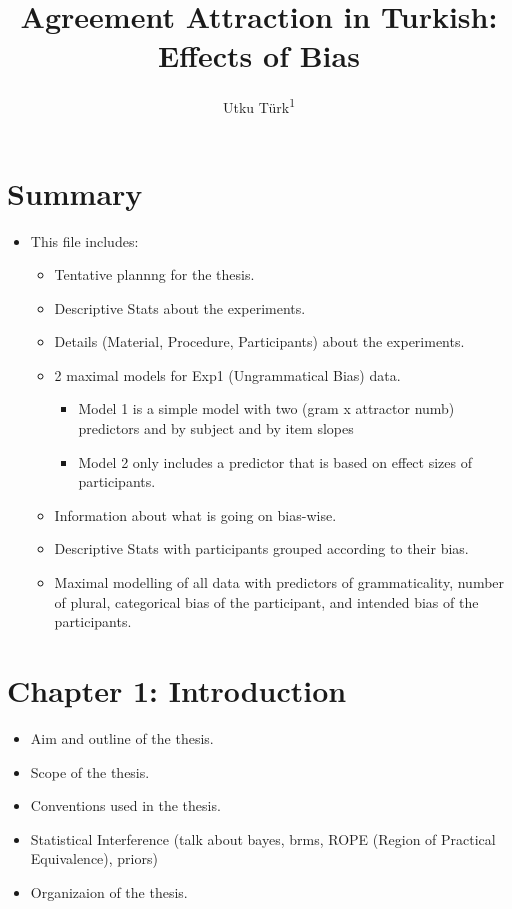 \documentclass[
  10pt,
  english,
  doc,floatsintext]{apa6}
\title{Agreement Attraction in Turkish: Effects of Bias}
\author{Utku Türk\textsuperscript{1}}
\date{}
\affiliation{\vspace{0.5cm}\textsuperscript{1} Boğaziçi University}
\providecommand{\tightlist}{%
  \setlength{\itemsep}{0pt}\setlength{\parskip}{0pt}}
\begin{document}
\maketitle

\hypertarget{summary}{%
\section*{Summary}\label{summary}}

\begin{itemize}
\item
  This file includes:

  \begin{itemize}
  \tightlist
  \item
    Tentative plannng for the thesis.
  \item
    Descriptive Stats about the experiments.
  \item
    Details (Material, Procedure, Participants) about the experiments.
  \item
    2 maximal models for Exp1 (Ungrammatical Bias) data.

    \begin{itemize}
    \tightlist
    \item
      Model 1 is a simple model with two (gram x attractor numb) predictors and by subject and by item slopes
    \item
      Model 2 only includes a predictor that is based on effect sizes of participants.
    \end{itemize}
  \item
    Information about what is going on bias-wise.
  \item
    Descriptive Stats with participants grouped according to their bias.
  \item
    Maximal modelling of all data with predictors of grammaticality, number of plural, categorical bias of the participant, and intended bias of the participants.
  \end{itemize}
\end{itemize}

\hypertarget{intro}{%
\section{Chapter 1: Introduction}\label{intro}}

\begin{itemize}
\tightlist
\item
  Aim and outline of the thesis.
\item
  Scope of the thesis.
\item
  Conventions used in the thesis.
\item
  Statistical Interference (talk about bayes, brms, ROPE (Region of Practical Equivalence), priors)
\item
  Organizaion of the thesis.
\end{itemize}
\end{document}
